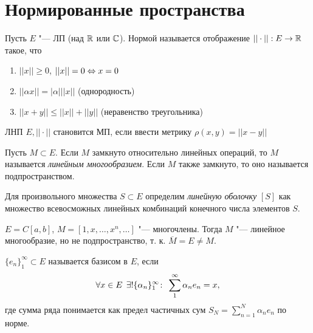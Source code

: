 \documentclass[main]{subfiles}
\begin{document}
\section{Нормированные пространства}
\begin{definition}
  Пусть \( E \) "--- ЛП (над \( \mathbb{R} \) или \( \mathbb{C} \)).
  Нормой называется отображение \( ||\cdot|| : E \to \mathbb{R} \)
  такое, что
  \begin{enumerate}
    \item \( ||x|| \ge 0 \), \( ||x|| = 0 \Leftrightarrow x = 0 \)
    \item \( ||\alpha x|| = |\alpha| ||x|| \) (однородность)
    \item \( ||x + y|| \le ||x|| + ||y|| \) (неравенство треугольника)
  \end{enumerate}
\end{definition}

\begin{exercise}
  ЛНП \( E, ||\cdot|| \) становится МП, если ввести метрику
  \( \rho(x, y) = ||x - y|| \)
\end{exercise}

\begin{definition}
  Пусть \( M \subset E \). Если \( M \) замкнуто относительно
  линейных операций, то \( M \) называется \emph{линейным многообразием}.
  Если \( M \) также замкнуто, то оно называется подпространством.
\end{definition}

\begin{definition}
  Для произвольного множества \( S \subset E \) определим
  \emph{линейную оболочку} \( [S] \) как множество всевосможных линейных комбинаций
  конечного числа элементов \( S \).
\end{definition}

\begin{example}
  \( E = C[a, b] \), \( M = [1, x, \dots, x^n, \dots] \) "--- многочлены.
  Тогда \( M \) "--- линейное многообразие, но не подпространство,
  т. к. \( \overline{M} = E \ne M \).
\end{example}

\begin{definition}
  \( \{ e_n \}_1^\infty \subset E \) называется базисом  в \( E \),
  если
  \[ \forall {x \in E} \; \, \exists!  \{ \alpha_n \}_1^\infty  \colon \:
  \sum_1^\infty \alpha_n e_n = x, \]
  где сумма ряда понимается как предел частичных сум
  \( S_N = \sum_{n = 1}^N \alpha_n e_n \) по норме.
\end{definition}
\end{document}
